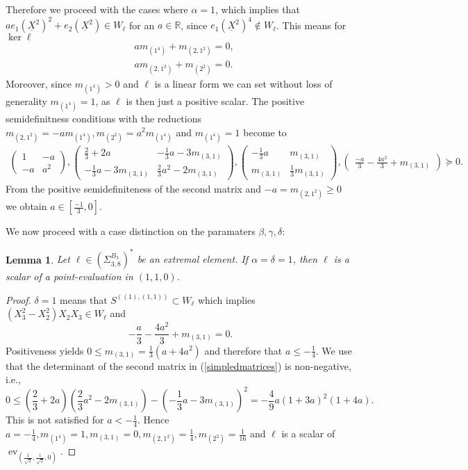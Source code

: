 \documentclass[11pt,a4paper]{amsart}
\numberwithin{equation}{section}
\newtheorem{lemma}[thm]{Lemma}
\theoremstyle{definition}
\newcommand{\R}{\mathbb{R}}
\DeclareMathOperator{\ev}{ev}
\numberwithin{thm}{section}
\theoremstyle{break}
\numberwithin{subcase}{case}
\begin{document}
 Therefore we proceed with the cases where ${\alpha = 1}$, which implies that $ae_1(\underline{X}^2)^2 + e_2(\underline{X}^2) \in W_\ell$ for an $a \in \R$, since $e_1(\underline{X}^2)^4 \not \in W_\ell$. This means for $\ker \ell$ \begin{align*}
  & a m_{(1^4)} + m_{(2,1^2)} = 0, \\ & am_{(2,1^2)}+m_{(2^2)} = 0.  
 \end{align*} Moreover, since $m_{(1^4)}> 0$ and $\ell$ is a linear form we can set without loss of generality $m_{(1^4)}=1$, as $\ell$ is then just a positive scalar. 
 The positive semidefinitness conditions with the reductions $m_{(2,1^2)} = -am_{(1^4)}, m_{(2^2)} = a^2m_{(1^4)}$ and $m_{(1^4)} =1$ become to
 \begin{align}\label{simpledmatrices}
     \left( \begin{smallmatrix}
      1    & -a \\
    -a      & a^2
     \end{smallmatrix} \right), 
     \left(\begin{smallmatrix} \frac{2}{3}+2a & -\frac{1}{3}a-3m_{(3,1)} \\ -\frac{1}{3}a-3m_{(3,1)} & \frac{2}{3}a^2-2m_{(3,1)}  \end{smallmatrix} \right), 
     \left( \begin{smallmatrix}
    -\frac{1}{3}a      &m_{(3,1)}  \\
    m_{(3,1)}      & \frac{1}{3}m_{(3,1)}
     \end{smallmatrix} \right), 
     \left( \begin{smallmatrix} \frac{-a}{3}-\frac{4a^2}{3}+m_{(3,1)}  \end{smallmatrix} \right) \succeq 0.
 \end{align}
 From the positive semidefiniteness of the second matrix and $-a=m_{(2,1^2)} \geq 0$ we obtain $a \in [\frac{-1}{3},0]$. 


We now proceed with a case distinction on the paramaters $\beta,\gamma,\delta$:
 
 
 \begin{lemma}\label{le:38Teil3}
Let $\ell \in \left(\Sigma_{3,8}^{B_3}\right)^\ast$ be an extremal element. If $\alpha = \delta = 1$, then $\ell$ is a scalar of a point-evaluation in $(1,1,0)$.
 \end{lemma}
 \begin{proof}
$\delta=1$ means that $S^{((1),(1,1))} \subset W_\ell$ which implies $(X_3^2-X_2^2)X_2X_3 \in W_\ell$ and  $$-\frac{a}{3}-\frac{4a^2}{3}+m_{(3,1)}=0.$$ Positiveness yields $0 \leq m_{(3,1)} = \frac{1}{3}(a+4a^2)$ and therefore that $ a \leq -\frac{1}{4}$.
We use that the determinant of the second matrix in (\ref{simpledmatrices}) is non-negative, i.e., $$ 0 \leq \left(\frac{2}{3}+2a\right)\left(\frac{2}{3}a^2-2m_{(3,1)}\right)-\left( -\frac{1}{3}a-3m_{(3,1)} \right)^2 = -\frac{4}{9} a (1 + 3 a)^2 (1 + 4 a).$$ This is not satisfied for $ a < -\frac{1}{4}$. Hence $a = -\frac{1}{4}, m_{(1^4)}=1,m_{(3,1)}=0,m_{(2,1^2)}=\frac{1}{4}, m_{(2^2)} = \frac{1}{16}$ and $\ell$ is a scalar of $\ev_{\left(\frac{1}{\sqrt{2}},\frac{1}{\sqrt{2}},0\right)}$.  
 \end{proof}
 
\end{document}
